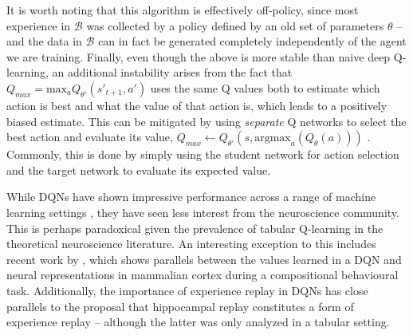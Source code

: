 It is worth noting that this algorithm is effectively off-policy, since most experience in $\mathcal{B}$ was collected by a policy defined by an old set of parameters $\theta$ -- and the data in $\mathcal{B}$ can in fact be generated completely independently of the agent we are training.
Finally, even though the above is more stable than naive deep Q-learning, an additional instability arises from the fact that $Q_{max} = \text{max}_a Q_{\theta'}(s'_{t+1}, a')$ uses the same Q values both to estimate which action is best and what the value of that action is, which leads to a positively biased estimate.
This can be mitigated by using \emph{separate} Q networks to select the best action and evaluate its value, $Q_{max} \leftarrow Q_{\theta'}(s, \text{argmax}_a(Q_{\theta}(a)))$ \citep{van2016deep}.
Commonly, this is done by simply using the student network for action selection and the target network to evaluate its expected value.

While DQNs have shown impressive performance across a range of machine learning settings \citep{mnih2013playing, lillicrap2015continuous, schaul2015prioritized, kalashnikov2018qt}, they have seen less interest from the neuroscience community.
This is perhaps paradoxical given the prevalence of tabular Q-learning in the theoretical neuroscience literature.
An interesting exception to this includes recent work by \citet{makino2023arithmetic}, which shows parallels between the values learned in a DQN and neural  representations in mammalian cortex during a compositional behavioural task.
Additionally, the importance of experience replay in DQNs \citep{mnih2013playing, schaul2015prioritized} has close parallels to the proposal that hippocampal replay constitutes a form of experience replay \citep{mattar2018prioritized} -- although the latter was only analyzed in a tabular setting.

